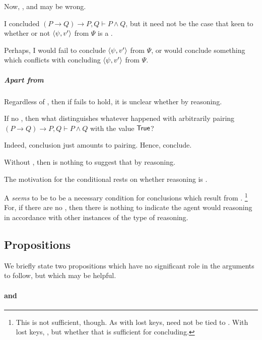 \begin{note}
  Now, , and  may be wrong.

  I concluded \((P \rightarrow Q) \rightarrow P, Q \vdash P \land Q\), but it need not be the case that {\color{blue} keen} to whether or not \(\langle \psi, v' \rangle\) from \(\Psi\) is a \fc{}.

  Perhaps, I would fail to conclude \(\langle \psi, v' \rangle\) from \(\Psi\), or would conclude something which conflicts with concluding \(\langle \psi, v' \rangle\) from \(\Psi\).
\end{note}

\subparagraph{Apart from }

\begin{note}
  Regardless of , then if \requ{} fails to hold, it is unclear whether \tC{} by reasoning.

  If no \requ{}, then what distinguishes whatever happened with arbitrarily pairing \((P \rightarrow Q) \rightarrow P, Q \vdash P \land Q\) with the value \(\text{\textsf{True}}\)?

  Indeed, conclusion just amounts to pairing.
  Hence, conclude.

  Without , then is nothing to suggest that \tC{} by reasoning.
\end{note}

\begin{note}
  The motivation for the conditional rests on whether reasoning is \tC{}.

  A \requ{} \emph{seems} to be to be a necessary condition for conclusions which result from \tC{}.%
  \footnote{
    This is not sufficient, though.
    As with lost keys, \requ{} need not be tied to \tC{}.
    With lost keys, \tC{}, but whether that is sufficient for concluding.
  }
  For, if there are no , then there is nothing to indicate the agent would reasoning in accordance with other instances of the type of reasoning.
\end{note}

\subsection{Propositions}
\label{cha:requs:requs:props}

\begin{note}
  We briefly state two propositions which have no significant role in the arguments to follow, but which may be helpful.
\end{note}

\paragraph*{ and \issueConstraint{}}

